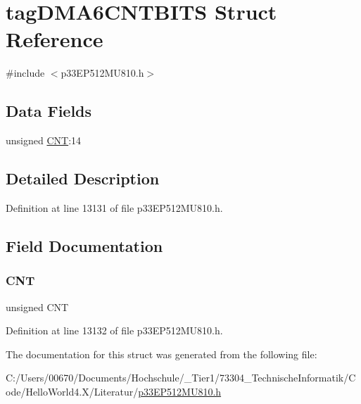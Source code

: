 \hypertarget{structtag_d_m_a6_c_n_t_b_i_t_s}{}\section{tag\+D\+M\+A6\+C\+N\+T\+B\+I\+TS Struct Reference}
\label{structtag_d_m_a6_c_n_t_b_i_t_s}


{\ttfamily \#include $<$p33\+E\+P512\+M\+U810.\+h$>$}

\subsection*{Data Fields}
\begin{DoxyCompactItemize}
\item 
unsigned \hyperlink{structtag_d_m_a6_c_n_t_b_i_t_s_a30be39d82c244f19fd98dd74227487f6}{C\+NT}\+:14
\end{DoxyCompactItemize}


\subsection{Detailed Description}


Definition at line 13131 of file p33\+E\+P512\+M\+U810.\+h.



\subsection{Field Documentation}
\mbox{\label{structtag_d_m_a6_c_n_t_b_i_t_s_a30be39d82c244f19fd98dd74227487f6}} 
\subsubsection{\texorpdfstring{C\+NT}{CNT}}
{\footnotesize\ttfamily unsigned C\+NT}



Definition at line 13132 of file p33\+E\+P512\+M\+U810.\+h.



The documentation for this struct was generated from the following file\+:\begin{DoxyCompactItemize}
\item 
C\+:/\+Users/00670/\+Documents/\+Hochschule/\+\_\+\+Tier1/73304\+\_\+\+Technische\+Informatik/\+Code/\+Hello\+World4.\+X/\+Literatur/\hyperlink{p33_e_p512_m_u810_8h}{p33\+E\+P512\+M\+U810.\+h}\end{DoxyCompactItemize}
